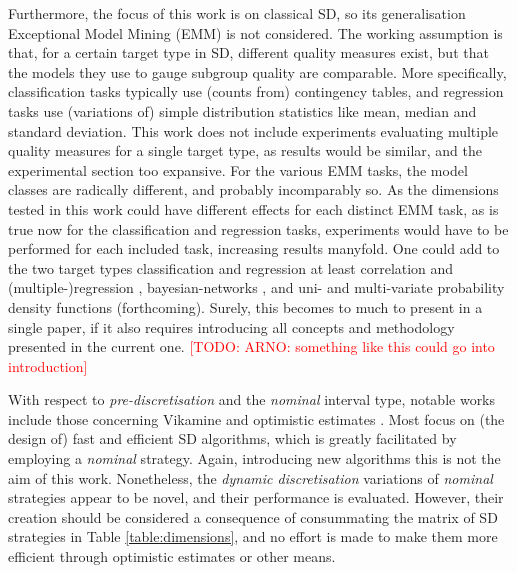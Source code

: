 \documentclass[smallextended]{svjour3}
\newcommand{\todo}[1]{\textcolor{red}{[TODO: #1]}}
\newcommand{\parameter}{\emph}
\newcommand{\dyndis}{\parameter{dynamic discretisation}}
\newcommand{\predis}{\parameter{pre-discretisation}}
\newcommand{\nominal}{\parameter{nominal}}
\newcommand{\sd}{SD}
\newcommand{\emm}{EMM}
\begin{document}
Furthermore, the focus of this work is on classical \sd{}, so its generalisation Exceptional Model Mining (\emm{}) \cite{duivesteijn:2013,leman:2008,lemmerich:2012} is not considered. 
The working assumption is that, for a certain target type in \sd{}, different quality measures exist, but that the models they use to gauge subgroup quality are comparable.
More specifically, classification tasks typically use (counts from) contingency tables, and regression tasks use (variations of) simple distribution statistics like mean, median and standard deviation.
This work does not include experiments evaluating multiple quality measures for a single target type, as results would be similar, and the experimental section too expansive.
For the various \emm{} tasks, the model classes are radically different, and probably incomparably so.
As the dimensions tested in this work could have different effects for each distinct \emm{} task, as is true now for the classification and regression tasks, experiments would have to be performed for each included task, increasing results manyfold.
One could add to the two target types classification and regression at least correlation and (multiple-)regression \cite{leman:2008,duivesteijn:2012}, bayesian-networks \cite{duivesteijn:2010}, and uni- and multi-variate probability density functions (forthcoming).
Surely, this becomes to much to present in a single paper, if it also requires introducing all concepts and methodology presented in the current one.
\todo{ARNO: something like this could go into introduction}

With respect to \predis{} and the \nominal{} interval type, notable works include those concerning Vikamine \cite{atzmueller:2012:vikamine} and optimistic estimates \cite{atzmueller:2009:ismis,boley:2017,grosskreutz:2009,lemmerich:2012}.
Most focus on (the design of) fast and efficient \sd{} algorithms, which is greatly facilitated by employing a \nominal{} strategy.
Again, introducing new algorithms this is not the aim of this work.
Nonetheless, the \dyndis{} variations of \nominal{} strategies appear to be novel, and their performance is evaluated.
However, their creation should be considered a consequence of consummating the matrix of \sd{} strategies in Table \ref{table:dimensions}, and no effort is made to make them more efficient through optimistic estimates or other means.
\end{document}
